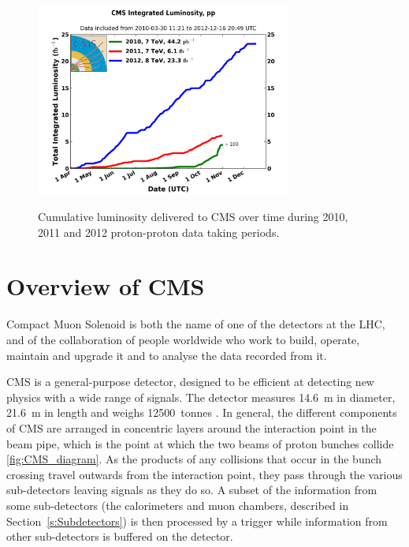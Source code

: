 \begin{figure}[hbtp]
   \centering
     \includegraphics[width=0.75\textwidth]{Chapters/02_Detector/Images/int_lumi_cumulative_pp_2.png}\\
     \caption[Cumulative luminosity delivered to CMS during 2010, 2011 and 2012.]{Cumulative luminosity
     delivered to CMS over time during 2010, 2011 and 2012 proton-proton data taking periods.}
     \label{fig:integrated_luminosity}
\end{figure}

\section{Overview of CMS}
\label{s:Overview}
Compact Muon Solenoid is both the name of one of the detectors at the LHC, and of the collaboration of
people worldwide who work to build, operate, maintain and upgrade it and to analyse the data recorded from it.

CMS is a general-purpose detector, designed to be efficient at detecting new physics with a wide range of
signals. The detector measures 14.6~m in diameter, 21.6~m in length and weighs 12500~tonnes
\cite{CMS_experiment}. In general, the different components of CMS are arranged in concentric layers around
the interaction point in the beam pipe, which is the point at which the two beams of proton bunches collide
\ref{fig:CMS_diagram}. As the products of any collisions that occur in the bunch crossing travel outwards from
the interaction point, they pass through the various sub-detectors leaving signals as they do so. A subset of
the information from some sub-detectors (the calorimeters and muon chambers, described in
Section~\ref{s:Subdetectors}) is then processed by a trigger while information from other sub-detectors is
buffered on the detector.

